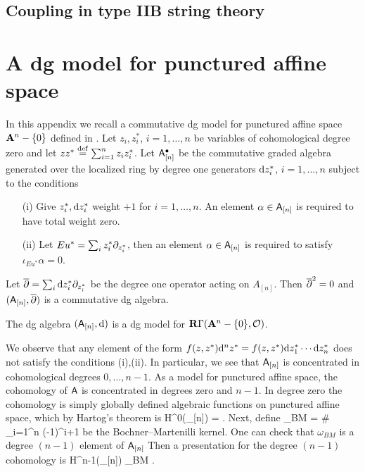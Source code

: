 \documentclass[11pt]{amsart}
\begin{document}
\subsection{Coupling in type IIB string theory}

\newpage

\appendix

\section{A dg model for punctured affine space} \label{appx:A}

In this appendix we recall a commutative dg model for punctured affine space ${\mathbf{A}}^n - \{0\}$ defined in \cite{FHK}.
Let $z_i,z_i^*$, $i=1,\ldots,n$ be variables of cohomological degree zero and let $z z^* \overset{\rm def}{=} \sum_{i=1}^n z_i z_i^*$.
Let $\mathsf A_{[n]}^\bullet$ be the commutative graded algebra generated over the localized ring
\beqn
\C[z_i,z_i^*] [(z z^*)^{-1}]
\eeqn
by degree one generators ${\rm d} z_i^*$, $i=1,\ldots,n$ subject to the conditions
\begin{itemize}
\item[(i)] Give $z^*_i, {\rm d} z^*_i$ weight $+1$ for $i=1,\ldots,n$.
An element $\alpha \in \mathsf A_{[n]}$ is required to have total weight zero.
\item[(ii)] Let $Eu^* = \sum_i z_i^* \partial_{z_i^*}$, then an element $\alpha \in \mathsf A_{[n]}$ is required to satisfy $\iota_{Eu^*} \alpha = 0$.
\end{itemize}

Let $\overline{\partial} = \sum_i {\rm d} z_i^* \partial_{z_i^*}$ be the degree one operator acting on $A_{[n]}$.
Then $\overline{\partial}^2 = 0$ and $(\mathsf A_{[n]},\overline{\partial})$ is a commutative dg algebra.

\begin{thm}
The dg algebra $(\mathsf A_{[n]},{\rm d})$ is a dg model for $\mathbf{R} \Gamma({\mathbf{A}}^n - \{0\}, \mathcal O)$.
\end{thm}

We observe that any element of the form $f(z,z^*) {\rm d}^n z^* = f(z,z^*) {\rm d} z_1^* \cdots {\rm d} z_n^*$ does not satisfy the conditions (i),(ii).
In particular, we see that $\mathsf A_{[n]}$ is concentrated in cohomological degrees $0,\ldots,n-1$.
As a model for punctured affine space, the cohomology of $\mathsf A$ is concentrated in degrees zero and $n-1$.
In degree zero the cohomology is simply globally defined algebraic functions on punctured affine space, which by Hartog's theorem is
\beqn
H^0(\sfA_{[n]}) = \C[z_1,\ldots,z_n] .
\eeqn
Next, define
\beqn
\omega_{BM} = \# \sum_{i=1}^n (-1)^{i+1} 
\eeqn
be the Bochner--Martenilli kernel.
One can check that $\omega_{BM}$ is a degree $(n-1)$ element of $\mathsf A_{[n]}$
Then a presentation for the degree $(n-1)$ cohomology is 
\beqn
H^{n-1}(\sfA_{[n]}) \cong {} \omega_{BM} .
\eeqn
\end{document}
